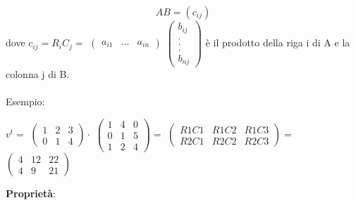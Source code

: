 \documentclass[12pt]{article}
\begin{document}
\[AB = (c_{ij})\]
dove $c_{ij} = R_iC_j =
$
$\begin{pmatrix}
  a_{i1} & \dots & a_{in}
\end{pmatrix}$
$\begin{pmatrix}
    b_{ij}\\
    .\\
    .\\
    .\\
    b_{nj}
\end{pmatrix}$
è il prodotto della riga i di A e la colonna j di B.
\\\\
Esempio:

\begin{center}
$v^t =$
$\begin{pmatrix}
  1 & 2 & 3\\
  0 & 1 & 4
\end{pmatrix} \cdot$
$\begin{pmatrix}
    1 & 4 & 0\\
    0 & 1 & 5\\
    1 & 2 & 4
\end{pmatrix} = $
$\begin{pmatrix}
    R1C1 & R1C2 & R1C3\\
    R2C1 & R2C2 & R2C3
\end{pmatrix} = $
$\begin{pmatrix}
    4 & 12 & 22\\
    4 & 9 & 21
\end{pmatrix}$
\end{center}
\textbf{Proprietà}:
\end{document}
